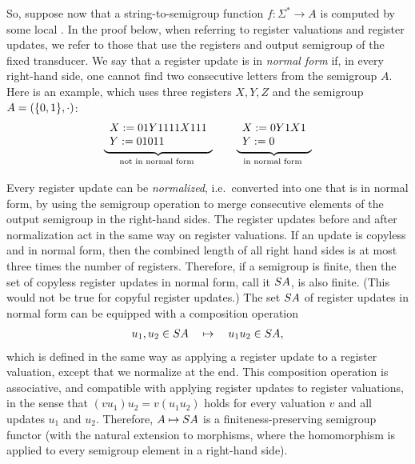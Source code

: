 So, suppose now that a string-to-semigroup function $f\colon \Sigma^* \to A$ is
computed by some local \sst. In the proof below, when referring to register valuations and register updates, we refer to those that use the registers and output semigroup of the fixed transducer. We say that a register update is in \emph{normal form} if, in every right-hand side, one cannot find two consecutive letters from the semigroup $A$.
Here is an example, which uses three registers $X,Y,Z$ and the semigroup $A = (\{0,1\}, \cdot)$:
\begin{align*}
\myunderbrace{
\begin{array}{l}
    X:= 01Y1111X111\\
Y:= 01011
\end{array}
}{not in normal form}
\qquad 
\myunderbrace{
\begin{array}{l}
    X:= 0Y1X1\\
Y:= 0
\end{array}
}{in normal form}
\end{align*}

Every register update can be \emph{normalized}, i.e.~converted into one that is in normal form, by using the semigroup operation to merge consecutive elements of the output semigroup in the right-hand sides. The  register updates before and after normalization act in the same way on register valuations.   If an update is copyless and in normal form, then the combined length of all right hand sides is at most three times the number of registers. Therefore, if a semigroup is finite, then the set of copyless register updates in normal form, call it $\functors A$,  is also finite. (This would not be true for copyful register updates.) The set $\functors A$ of register updates in normal form can be equipped with a composition operation 
\begin{align*}
    u_1,u_2 \in \functors A  \quad \mapsto \quad u_1u_2 \in \functors A,
    \end{align*}
which is defined in the same way as applying a register update to a register
valuation, except that we normalize at the end. This composition operation is
associative, and  compatible with applying register updates to register
valuations, in the sense that $(vu_1)u_2 = v(u_1u_2)$ holds for every valuation
$v$ and all updates $u_1$ and $u_2$. Therefore, $A \mapsto \functors A$ is a finiteness-preserving semigroup functor (with the natural extension to morphisms, where the homomorphism is applied to every semigroup element in a right-hand side). 

